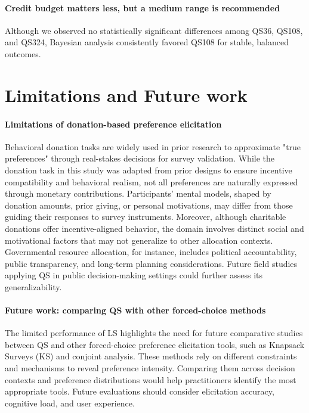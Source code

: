 \paragraph{Credit budget matters less, but a medium range is recommended}
Although we observed no statistically significant differences among QS36, QS108, and QS324, Bayesian analysis consistently favored QS108 for stable, balanced outcomes.

\section{Limitations and Future work}
\label{sec:limitations}

\paragraph{Limitations of donation-based preference elicitation}
Behavioral donation tasks are widely used in prior research to approximate "true preferences" through real-stakes decisions for survey validation. While the donation task in this study was adapted from prior designs to ensure incentive compatibility and behavioral realism, not all preferences are naturally expressed through monetary contributions. Participants' mental models, shaped by donation amounts, prior giving, or personal motivations, may differ from those guiding their responses to survey instruments. Moreover, although charitable donations offer incentive-aligned behavior, the domain involves distinct social and motivational factors that may not generalize to other allocation contexts. Governmental resource allocation, for instance, includes political accountability, public transparency, and long-term planning considerations. Future field studies applying QS in public decision-making settings could further assess its generalizability.

\paragraph{Future work: comparing QS with other forced-choice methods}
The limited performance of LS highlights the need for future comparative studies between QS and other forced-choice preference elicitation tools, such as Knapsack Surveys (KS) and conjoint analysis. These methods rely on different constraints and mechanisms to reveal preference intensity. Comparing them across decision contexts and preference distributions would help practitioners identify the most appropriate tools. Future evaluations should consider elicitation accuracy, cognitive load, and user experience.
